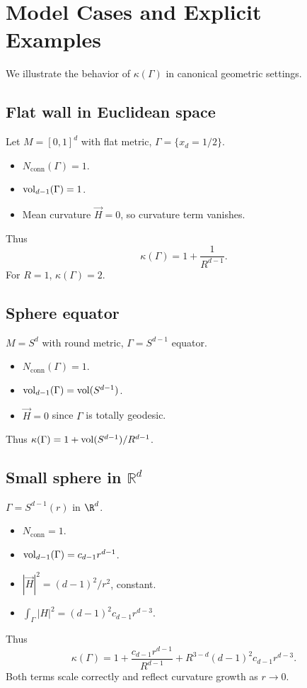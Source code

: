\bigskip


\section{Model Cases and Explicit Examples}
\label{sec:examples-kappa}

We illustrate the behavior of $\kappa(\Gamma)$ in canonical geometric settings.

\subsection{Flat wall in Euclidean space}
Let $M=[0,1]^d$ with flat metric, $\Gamma=\{x_d=1/2\}$.
\begin{itemize}
\item $N_{\mathrm{conn}}(\Gamma)=1$.
\item $\operatorname{vol}_{d-1}(\Gamma)=1$.
\item Mean curvature $\vec H=0$, so curvature term vanishes.
\end{itemize}
Thus
\[
\kappa(\Gamma)=1+\frac{1}{R^{d-1}}.
\]
For $R=1$, $\kappa(\Gamma)=2$.

\subsection{Sphere equator}
$M=S^d$ with round metric, $\Gamma=S^{d-1}$ equator.
\begin{itemize}
\item $N_{\mathrm{conn}}(\Gamma)=1$.
\item $\operatorname{vol}_{d-1}(\Gamma)=\operatorname{vol}(S^{d-1})$.
\item $\vec H=0$ since $\Gamma$ is totally geodesic.
\end{itemize}
Thus $\kappa(\Gamma)=1+\operatorname{vol}(S^{d-1})/R^{d-1}$.

\subsection{Small sphere in $\mathbb{R}^d$}
$\Gamma=S^{d-1}(r)$ in $\R^d$.
\begin{itemize}
\item $N_{\mathrm{conn}}=1$.
\item $\operatorname{vol}_{d-1}(\Gamma)=c_{d-1} r^{d-1}$.
\item $|\vec H|^2=(d-1)^2/r^2$, constant.
\item $\int_\Gamma |H|^2 = (d-1)^2 c_{d-1} r^{d-3}$.
\end{itemize}
Thus
\[
\kappa(\Gamma)=1+\frac{c_{d-1} r^{d-1}}{R^{d-1}}+R^{3-d}(d-1)^2 c_{d-1} r^{d-3}.
\]
Both terms scale correctly and reflect curvature growth as $r\to 0$.

